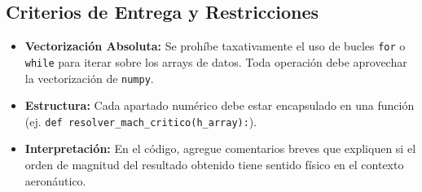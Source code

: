 	\subsection*{Criterios de Entrega y Restricciones}
	
	\begin{itemize}
		\item \textbf{Vectorización Absoluta:} Se prohíbe taxativamente el uso de bucles \texttt{for} o \texttt{while} para iterar sobre los arrays de datos. Toda operación debe aprovechar la vectorización de \texttt{numpy}.
		\item \textbf{Estructura:} Cada apartado numérico debe estar 
		encapsulado en una función \\
		(ej. \texttt{def resolver\_mach\_critico(h\_array):}).
		\item \textbf{Interpretación:} En el código, 
		agregue comentarios breves que expliquen si el orden de magnitud del resultado obtenido tiene sentido físico en el contexto aeronáutico.
	\end{itemize}
	